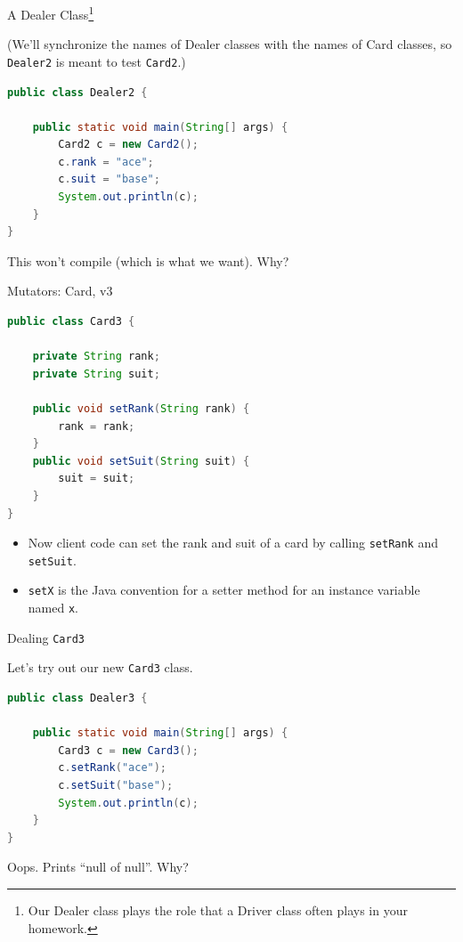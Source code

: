 \documentclass{beamer}
\begin{document}
\begin{frame}[fragile]{A Dealer Class\footnote{Our Dealer class plays the role that a Driver class often plays in your homework.}}


(We'll synchronize the names of Dealer classes with the names of Card classes, so {\tt Dealer2} is meant to test {\tt Card2}.)
\begin{lstlisting}[language=Java]
public class Dealer2 {

    public static void main(String[] args) {
        Card2 c = new Card2();
        c.rank = "ace";
        c.suit = "base";
        System.out.println(c);
    }
}
\end{lstlisting}

This won't compile (which is what we want). Why?

\end{frame}

\begin{frame}[fragile]{Mutators: Card, v3}

\begin{lstlisting}[language=Java]
public class Card3 {

    private String rank;
    private String suit;

    public void setRank(String rank) {
        rank = rank;
    }
    public void setSuit(String suit) {
        suit = suit;
    }
}
\end{lstlisting}
\begin{itemize}
\item Now client code can set the rank and suit of a card by calling {\tt setRank} and {\tt setSuit}.
\item {\tt setX} is the Java convention for a setter method for an instance variable named {\tt x}.
\end{itemize}

\end{frame}

\begin{frame}[fragile]{Dealing {\tt Card3}}


Let's try out our new {\tt Card3} class.
\begin{lstlisting}[language=Java]
public class Dealer3 {

    public static void main(String[] args) {
        Card3 c = new Card3();
        c.setRank("ace");
        c.setSuit("base");
        System.out.println(c);
    }
}
\end{lstlisting}

Oops.  Prints ``null of null''.  Why?


\end{frame}
\end{document}
